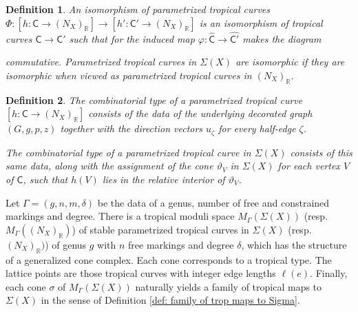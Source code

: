 \documentclass{article}
\def\R{\mathbb{R}}
\newtheorem{definition}{Definition}[section]
\newcommand{\tropC}{\mathsf{C}}
\begin{document}
    \begin{definition}
        An isomorphism of parametrized tropical curves $\Phi: [h:\tropC \rightarrow (N_X)_{\mathbb{R}}] \rightarrow [h':\tropC'\rightarrow (N_X)_{\mathbb{R}}]$ is an isomorphism of tropical curves $\tropC \rightarrow \tropC'$ such that for the induced map $\varphi: \hat{\tropC} \rightarrow \hat{\tropC'}$ makes the diagram
    \begin{center}
    \end{center}
    commutative. Parametrized tropical curves in $\Sigma(X)$ are isomorphic if they are isomorphic when viewed as parametrized tropical curves in $(N_X)_{\mathbb{R}}$.
    \end{definition}

    
    \begin{definition} \cite[Definition 4.1.1]{RSWII}  \label{def: comb-type}
        The combinatorial type of a parametrized tropical curve $[h:\tropC \rightarrow (N_X)_{\mathbb{R}}]$ consists of the data of the underlying decorated graph $(G, g, p, z)$ together with the direction vectors $u_\zeta$ for every half-edge $\zeta$. 
        
    The combinatorial type of a parametrized tropical curve in $\Sigma(X)$ consists of this same data, along with the assignment of the cone $\vartheta_V$ in $\Sigma(X)$ for each vertex $V$ of $\tropC$, such that $h(V)$ lies in the relative interior of $\vartheta_V$.
    \end{definition}
    

    Let $\Gamma  = (g,n,m,\delta)$ be the data of a genus, number of free and constrained markings and degree. There is a tropical moduli space $M_\Gamma(\Sigma(X))$ (resp. $M_\Gamma((N_X)_\R)$) of stable parametrized tropical curves in $\Sigma(X)$ (resp. $(N_X)_\R)$) of genus $g$ with $n$ free markings and degree $\delta$, which has the structure of a generalized cone complex. Each cone corresponds to a tropical type. The lattice points are those tropical curves with integer edge lengths $\ell(e)$. Finally, each cone $\sigma$ of $M_\Gamma(\Sigma(X))$ naturally yields a family of tropical maps to $\Sigma(X)$ in the sense of Definition \ref{def: family of trop maps to Sigma}.
\end{document}
